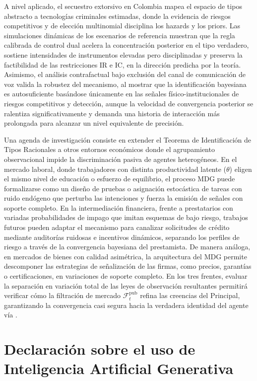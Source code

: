 \documentclass[review,authoryear,12pt]{elsarticle}
\theoremstyle{plain}
\theoremstyle{definition}
\newcommand{\1}{\mathbf{1}}
\begin{document}
A nivel aplicado, el secuestro extorsivo en Colombia mapea el espacio de tipos abstracto a tecnologías criminales estimadas, donde la evidencia de riesgos competitivos y de elección multinomial disciplina los hazards y los priors. Las simulaciones dinámicas de los escenarios de referencia muestran que la regla calibrada de control dual acelera la concentración posterior en el tipo verdadero, sostiene intensidades de instrumentos elevadas pero disciplinadas y preserva la factibilidad de las restricciones IR e IC, en la dirección predicha por la teoría. Asimismo, el análisis contrafactual bajo exclusión del canal de comunicación de voz valida la robustez del mecanismo, al mostrar que la identificación bayesiana es autosuficiente basándose únicamente en las señales físico-institucionales de riesgos competitivos y detección, aunque la velocidad de convergencia posterior se ralentiza significativamente y demanda una historia de interacción más prolongada para alcanzar un nivel equivalente de precisión.

Una agenda de investigación consiste en extender el Teorema de Identificación de Tipos Racionales a otros entornos económicos donde el agrupamiento observacional impide la discriminación pasiva de agentes heterogéneos. En el mercado laboral, donde trabajadores con distinta productividad latente ($\theta$) eligen el mismo nivel de educación o esfuerzo de equilibrio, el proceso MDG puede formalizarse como un diseño de pruebas o asignación estocástica de tareas con ruido endógeno que perturba las intenciones y fuerza la emisión de señales con soporte completo. En la intermediación financiera, frente a prestatarios con variadas probabilidades de impago que imitan esquemas de bajo riesgo, trabajos futuros pueden adaptar el mecanismo para canalizar solicitudes de crédito mediante auditorías ruidosas e incentivos dinámicos, separando los perfiles de riesgo a través de la convergencia bayesiana del prestamista. De manera análoga, en mercados de bienes con calidad asimétrica, la arquitectura del MDG permite descomponer las estrategias de señalización de las firmas, como precios, garantías o certificaciones, en variaciones de soporte completo. En los tres frentes, evaluar la separación en variación total de las leyes de observación resultantes permitirá verificar cómo la filtración de mercado $\mathcal{F}_t^{\mathrm{pub}}$ refina las creencias del Principal, garantizando la convergencia casi segura hacia la verdadera identidad del agente vía \citet{Kakutani1948}.


\section*{Declaración sobre el uso de Inteligencia Artificial Generativa}
\end{document}
